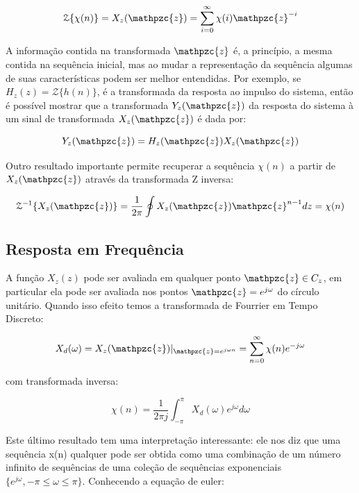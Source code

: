 {\begin{equation}
\mathcal{Z} \{ \chi(n) \} = X_z(\mathpzc{z}) = \sum_{i=0}^{\infty} \chi(i)\mathpzc{z}^{-i}
\label{eq:z-trans}
\end{equation}


A informação contida na transformada $\mathpzc{z}$ é, a princípio, a mesma contida na
sequência inicial, mas ao mudar a representação da sequência algumas de suas
características podem ser melhor entendidas. Por exemplo, se $H_z(z) = \mathcal{Z}\{h(n)\}$,
é a transformada da resposta ao impulso do sistema, então é possível mostrar que
a transformada $Y_z(\mathpzc{z})$ da resposta do sistema à um sinal de transformada $X_z(\mathpzc{z})$ é
dada por:

\begin{equation}
Y_z(\mathpzc{z}) = H_z(\mathpzc{z})X_z(\mathpzc{z})
\end{equation}

Outro resultado importante permite recuperar a sequência $\chi(n)$ a partir de $X_z(\mathpzc{z})$
através da transformada Z inversa:

\begin{equation}
\mathcal{Z}^{-1}\{X_z(\mathpzc{z})\} = \frac{1}{2 \pi} \oint X_z(\mathpzc{z}) \mathpzc{z}^{n-1}dz = \chi(n)
\end{equation}

\subsection{Resposta em Frequência}

A função $X_z(z)$ pode ser avaliada em qualquer ponto $\mathpzc{z} \in C_z$, em particular ela
pode ser avaliada nos pontos $\mathpzc{z} = e^{j\omega}$ do círculo unitário. Quando isso
efeito temos a transformada de Fourrier em Tempo Discreto:

\begin{equation}
\label{eq:DFT-transform}
X_d(\omega) = X_z(\mathpzc{z})|_{\mathpzc{z} = e^{j\omega n}} = \sum _{n=0}^{\infty} \chi(n) e^{-j\omega} 
\end{equation}

com transformada inversa:

\begin{equation}
\label{eq:DFT-inverse-transform}
\chi(n) = \frac{1}{2 \pi j} \int _{- \pi}^{\pi} X_d(\omega) e^{j\omega}d\omega
\end{equation}

Este último resultado tem uma interpretação interessante: ele nos diz que uma
sequência x(n) qualquer pode ser obtida como uma combinação de um número
infinito de sequências de uma coleção de sequências exponenciais
$\{e^{j\omega}, -\pi \leq \omega \leq \pi \}$. Conhecendo a equação de euler:

}
